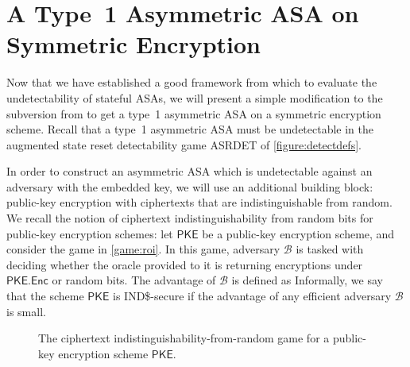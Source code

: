 \chapter{A Type~1 Asymmetric ASA on Symmetric Encryption} \label{sec:asymASA}
Now that we have established a good framework from which to evaluate the undetectability of stateful ASAs, we will present a simple modification to the subversion from \cite{C:BelPatRog14} to get a type~1 asymmetric ASA on a symmetric encryption scheme. Recall  that a type~1 asymmetric ASA must be undetectable in the augmented state reset detectability game ASRDET of \autoref{figure:detectdefs}.

In order to construct an asymmetric ASA which is undetectable against an adversary with the embedded key, we will use an additional building block: public-key encryption with ciphertexts that are indistinguishable from random. We recall the notion of ciphertext indistinguishability from random bits for public-key encryption schemes: let $\mathsf{PKE}$ be a public-key encryption scheme, and consider the game in \autoref{game:roi}. In this game, adversary $\mathcal{B}$ is tasked with deciding whether the oracle provided to it is returning encryptions under $\mathsf{PKE.Enc}$ or random bits. The advantage of $\mathcal{B}$ is defined as
Informally, we say that the scheme $\mathsf{PKE}$ is IND\$-secure if the advantage of any efficient adversary $\mathcal{B}$ is small.

\begin{figure}
\centering
\begin{pchstack}
\pchspace
{}
\end{pchstack}
\caption[The ciphertext indistinguishability-from-random game for a public-key encryption scheme]{The ciphertext indistinguishability-from-random game for a public-key encryption scheme $\mathsf{PKE}$.}
\label{game:roi}
\end{figure}

